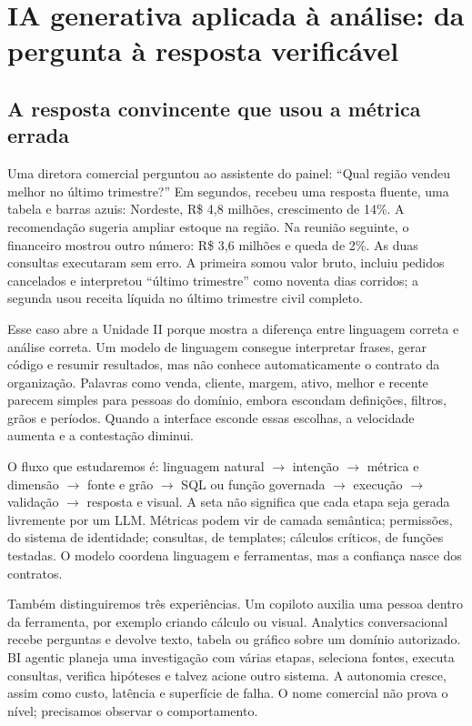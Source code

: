 \chapter[IA generativa aplicada à análise]{IA generativa aplicada à análise: da pergunta à resposta verificável}

\section{A resposta convincente que usou a métrica errada}

Uma diretora comercial perguntou ao assistente do painel: ``Qual região vendeu melhor no último trimestre?'' Em segundos, recebeu uma resposta fluente, uma tabela e barras azuis: Nordeste, R\$ 4,8 milhões, crescimento de 14\%. A recomendação sugeria ampliar estoque na região. Na reunião seguinte, o financeiro mostrou outro número: R\$ 3,6 milhões e queda de 2\%. As duas consultas executaram sem erro. A primeira somou valor bruto, incluiu pedidos cancelados e interpretou ``último trimestre'' como noventa dias corridos; a segunda usou receita líquida no último trimestre civil completo.

Esse caso abre a Unidade II porque mostra a diferença entre linguagem correta e análise correta. Um modelo de linguagem consegue interpretar frases, gerar código e resumir resultados, mas não conhece automaticamente o contrato da organização. Palavras como venda, cliente, margem, ativo, melhor e recente parecem simples para pessoas do domínio, embora escondam definições, filtros, grãos e períodos. Quando a interface esconde essas escolhas, a velocidade aumenta e a contestação diminui.

O fluxo que estudaremos é: linguagem natural $\rightarrow$ intenção $\rightarrow$ métrica e dimensão $\rightarrow$ fonte e grão $\rightarrow$ SQL ou função governada $\rightarrow$ execução $\rightarrow$ validação $\rightarrow$ resposta e visual. A seta não significa que cada etapa seja gerada livremente por um LLM. Métricas podem vir de camada semântica; permissões, do sistema de identidade; consultas, de templates; cálculos críticos, de funções testadas. O modelo coordena linguagem e ferramentas, mas a confiança nasce dos contratos.

Também distinguiremos três experiências. Um copiloto auxilia uma pessoa dentro da ferramenta, por exemplo criando cálculo ou visual. Analytics conversacional recebe perguntas e devolve texto, tabela ou gráfico sobre um domínio autorizado. BI agentic planeja uma investigação com várias etapas, seleciona fontes, executa consultas, verifica hipóteses e talvez acione outro sistema. A autonomia cresce, assim como custo, latência e superfície de falha. O nome comercial não prova o nível; precisamos observar o comportamento.

